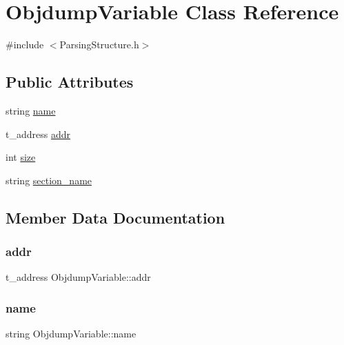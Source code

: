 \hypertarget{classObjdumpVariable}{}\section{Objdump\+Variable Class Reference}
\label{classObjdumpVariable}


{\ttfamily \#include $<$Parsing\+Structure.\+h$>$}

\subsection*{Public Attributes}
\begin{DoxyCompactItemize}
\item 
string \hyperlink{classObjdumpVariable_afd8cf5fe1be6ddb0c06e48f5101afe43}{name}
\item 
t\+\_\+address \hyperlink{classObjdumpVariable_a5895c2da8765c8a5a9f55fb4ef7f7cc8}{addr}
\item 
int \hyperlink{classObjdumpVariable_ac3d9609f3f9dfaf34b750d4d04f2935a}{size}
\item 
string \hyperlink{classObjdumpVariable_aa5939518d5ef92b43be57a8daeef30e7}{section\+\_\+name}
\end{DoxyCompactItemize}


\subsection{Member Data Documentation}
\mbox{\label{classObjdumpVariable_a5895c2da8765c8a5a9f55fb4ef7f7cc8}} 
\subsubsection{\texorpdfstring{addr}{addr}}
{\footnotesize\ttfamily t\+\_\+address Objdump\+Variable\+::addr}

\mbox{\label{classObjdumpVariable_afd8cf5fe1be6ddb0c06e48f5101afe43}} 
\subsubsection{\texorpdfstring{name}{name}}
{\footnotesize\ttfamily string Objdump\+Variable\+::name}

